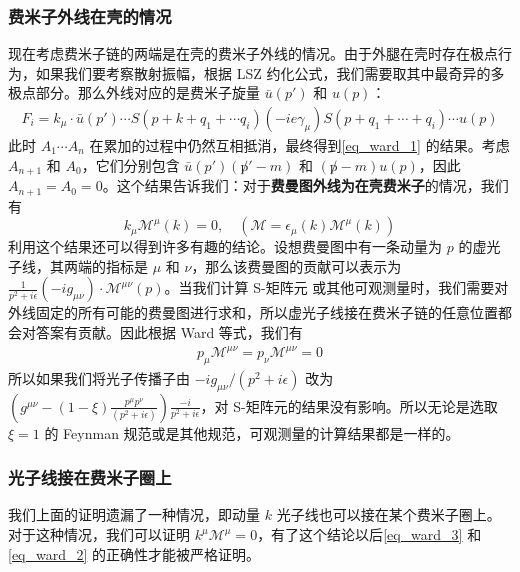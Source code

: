 \subsubsection{费米子外线在壳的情况}
现在考虑费米子链的两端是在壳的费米子外线的情况。由于外腿在壳时存在极点行为，如果我们要考察散射振幅，根据 LSZ 约化公式，我们需要取其中最奇异的多极点部分。那么外线对应的是费米子旋量 $\bar u(p')$ 和 $u(p)$：
\begin{equation}
\begin{aligned}
F_i = k_\mu \cdot \bar u(p')\cdots S(p+k+q_1+\cdots q_i)(-ie\gamma_\mu)S(p+q_1+\cdots + q_i)\cdots u(p)
\end{aligned}
\end{equation}
此时 $A_1\cdots A_n$ 在累加的过程中仍然互相抵消，最终得到\autoref{eq_ward_1} 的结果。考虑 $A_{n+1}$ 和 $A_0$，它们分别包含 $\bar u(p')(\not p'-m)$ 和 $(\not p-m)u(p)$，因此 $A_{n+1}=A_0=0$。这个结果告诉我们：对于\textbf{费曼图外线为在壳费米子}的情况，我们有
\begin{equation}
k_\mu \mathcal{M}^\mu(k) = 0,\quad (\mathcal{M} = \epsilon_\mu(k)\mathcal{M}^\mu(k))
\end{equation}
利用这个结果还可以得到许多有趣的结论。设想费曼图中有一条动量为 $p$ 的虚光子线，其两端的指标是 $\mu$ 和 $\nu$，那么该费曼图的贡献可以表示为 $\frac{1}{p^2+i\epsilon}(-ig_{\mu\nu})\cdot\mathcal{M}^{\mu\nu}(p)$。当我们计算 S-矩阵元 或其他可观测量时，我们需要对外线固定的所有可能的费曼图进行求和，所以虚光子线接在费米子链的任意位置都会对答案有贡献。因此根据 Ward 等式，我们有
\begin{equation}
\begin{aligned}
p_\mu \mathcal{M}^{\mu\nu} = p_\nu\mathcal{M}^{\mu\nu}= 0
\end{aligned}
\end{equation}
所以如果我们将光子传播子由 $-ig_{\mu\nu}/(p^2+i\epsilon)$ 改为 $\left(g^{\mu\nu}-(1-\xi)\frac{p^\mu p^\nu}{ (p^2+i\epsilon)}\right)\frac{-i}{p^2+i\epsilon}$，对 S-矩阵元的结果没有影响。所以无论是选取 $\xi=1$ 的 Feynman 规范或是其他规范，可观测量的计算结果都是一样的。
\subsubsection{光子线接在费米子圈上}
我们上面的证明遗漏了一种情况，即动量 $k$ 光子线也可以接在某个费米子圈上。对于这种情况，我们可以证明 $k^\mu \mathcal{M}^\mu=0$，有了这个结论以后\autoref{eq_ward_3} 和\autoref{eq_ward_2} 的正确性才能被严格证明。

